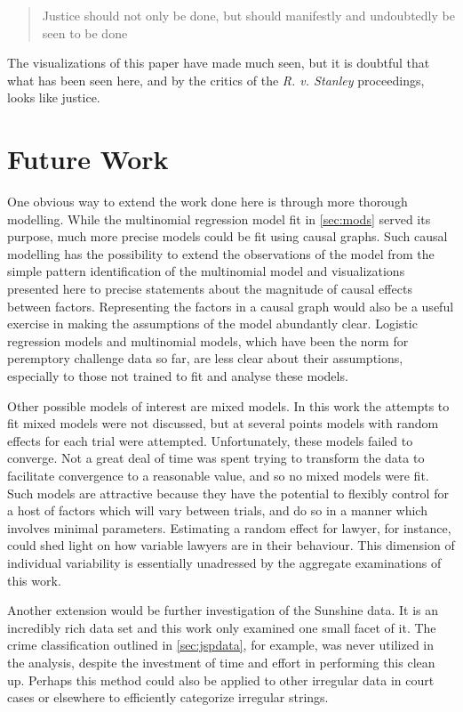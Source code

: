 \begin{quote}
  Justice should not only be done, but should manifestly and undoubtedly be seen to be done
\end{quote}

The visualizations of this paper have made much seen, but it is doubtful that what has been seen here, and by the critics of the
\textit{R. v. Stanley} proceedings, looks like justice.

\section{Future Work}
\label{sec:FutureWork}

One obvious way to extend the work done here is through more thorough modelling. While the multinomial regression model fit in
\ref{sec:mods} served its purpose, much more precise models could be fit using causal graphs. Such causal modelling has the
possibility to extend the observations of the model from the simple pattern identification of the multinomial model and
visualizations presented here to precise statements about the magnitude of causal effects between factors. Representing the
factors in a causal graph would also be a useful exercise in making the assumptions of the model abundantly clear. Logistic
regression models and multinomial models, which have been the norm for peremptory challenge data so far, are less clear about
their assumptions, especially to those not trained to fit and analyse these models.

Other possible models of interest are mixed models. In this work the attempts to fit mixed models were not discussed, but at
several points models with random effects for each trial were attempted. Unfortunately, these models failed to converge. Not a
great deal of time was spent trying to transform the data to facilitate convergence to a reasonable value, and so no mixed models
were fit. Such models are attractive because they have the potential to flexibly control for a host of factors which will vary
between trials, and do so in a manner which involves minimal parameters. Estimating a random effect for lawyer,
for instance, could shed light on how variable lawyers are in their behaviour. This dimension of individual variability is
essentially unadressed by the aggregate examinations of this work.

Another extension would be further investigation of the Sunshine data. It is an incredibly rich data set and this work only
examined one small facet of it. The crime classification outlined in \ref{sec:jspdata}, for example, was never utilized in the
analysis, despite the investment of time and effort in performing this clean up. Perhaps this method could also be
applied to other irregular data in court cases or elsewhere to efficiently categorize irregular strings.

